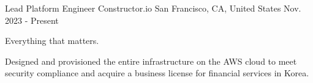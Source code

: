 

\begin{cventries}

  \cventry
    {Lead Platform Engineer} %
    {Constructor.io} %
    {San Francisco, CA, United States} %
    {Nov. 2023 - Present} %
    {
      \begin{cvitems} %
        \item {Everything that matters.}
        \item {Designed and provisioned the entire infrastructure on the AWS cloud to meet security compliance and acquire a business license for financial services in Korea.}
      \end{cvitems}
    }


\end{cventries}
